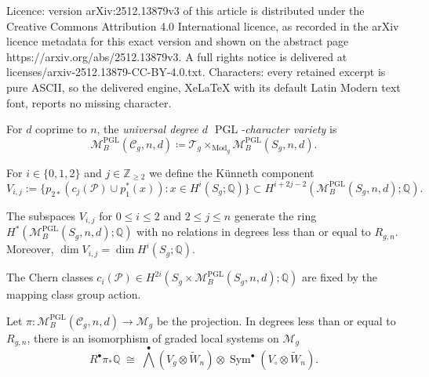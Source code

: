 \documentclass[10pt,a4paper]{amsart}
\DeclareMathOperator{\Mod}{Mod}
\DeclareMathOperator{\PGL}{PGL}
\DeclareMathOperator{\Sym}{Sym}
\newcommand{\C}{\mathcal{C}}
\newcommand{\M}{\mathcal{M}}
\newcommand{\QQ}{\mathbb{Q}}
\newcommand{\ZZ}{\mathbb{Z}}
\newcommand{\mc}{\mathcal}
\newcommand{\tW}{\widetilde{W}}
\begin{document}
Licence: version arXiv:2512.13879v3 of this article is distributed under the Creative Commons Attribution 4.0 International licence, as recorded in the arXiv licence metadata for this exact version and shown on the abstract page https://arxiv.org/abs/2512.13879v3. A full rights notice is delivered at licenses/arxiv-2512.13879-CC-BY-4.0.txt. Characters: every retained excerpt is pure ASCII, so the delivered engine, XeLaTeX with its default Latin Modern text font, reports no missing character.
\begin{definition}\label{defn: relative total PGL}
	For $d$ coprime to $n$, the \emph{universal degree $d$ $\PGL$-character variety} is 
	\begin{equation*}
		\M_{B}^{\PGL}(\C_g, n, d) \coloneqq \mc T_g \times_{\Mod_g} \M_{B}^{\PGL}(S_g,n,d).
	\end{equation*}
\end{definition}

\begin{definition}\label{def: alpha, beta, psi}
    For $i \in \{0,1,2\}$ and $j \in \ZZ_{\ge 2}$ we define the K\"unneth component $$V_{i,j} := \{p_{2*}(c_j(\mc P) \cup p_1^*(x)): x \in H^i(S_g;\QQ)\} \subset H^{i+2j-2}(\M_B^{\PGL}(S_g,n,d); \QQ).$$
\end{definition}

\begin{prop}\label{prop: free generation} %
    The subspaces $V_{i,j}$ for $0 \le i \le 2$ and $2 \le j \le n$ generate the ring $H^*(\M^{\PGL}_B(S_g,n,d); \QQ)$ with no relations in degrees less than or equal to $R_{g,n}$. Moreover, $\dim V_{i,j} = \dim H^i(S_g; \QQ)$.
\end{prop}

\begin{prop} \label{prop: identifying monodromy}
The Chern classes $c_i(\mc P) \in H^{2i}(S_g \times \M_B^{\PGL}(S_g,n,d); \QQ)$ are fixed by the mapping class group action.
\end{prop}

\begin{prop} \label{prop: monodromy action}
Let $\pi \colon \M_B^{\PGL}(\C_g,n,d) \to \M_g$ be the projection. In degrees less than or equal to $R_{g,n}$, there is an isomorphism of graded local systems on $\M_g$
\[
R^\bullet \pi_* \QQ \;\cong\; \textstyle{\bigwedge^\bullet}(V_g \otimes \tW_n) \otimes \Sym^\bullet(V_\circ \otimes \tW_n).
\]
\end{prop}
\end{document}
